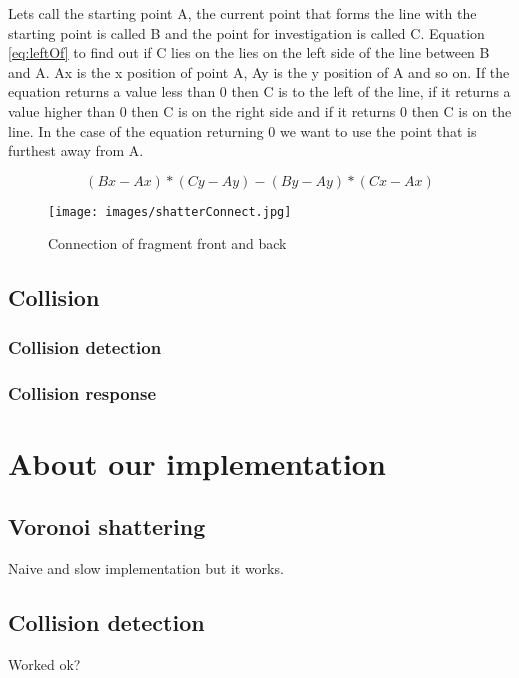\documentclass[10pt]{article}
\begin{document}
Lets call the starting point A, the current point that forms the line with
the starting point is called B and the point for investigation is called C.
Equation \ref{eq:leftOf} to find out if C lies on the lies on the left side
of the line between B and A. Ax is the x position of point A, Ay is the
y position of A and so on. If the equation returns a value less than 0 then
C is to the left of the line, if it returns a value higher than 0 then C is on
the right side and if it returns 0 then C is on the line. In the case of
the equation returning 0 we want to use the point that is furthest away from A.

\begin{equation}
  \label{eq:leftOf}
  (Bx-Ax)*(Cy-Ay)-(By-Ay)*(Cx-Ax)
\end{equation}

\begin{figure}
    \centering
    \texttt{[image: images/shatterConnect.jpg]}
    \caption{Connection of fragment front and back}
    \label{fig:shatterConnect}
\end{figure}

\subsection{Collision}

\subsubsection{Collision detection}

\subsubsection{Collision response}


\FloatBarrier


\newpage
\section{About our implementation}
\subsection{Voronoi shattering}
Naive and slow implementation but it works.

\subsection{Collision detection}
Worked ok?
\end{document}
